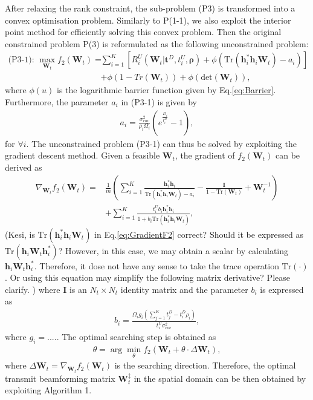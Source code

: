 \documentclass[12pt,draftcls,onecolumn,journal]{IEEEtran}
\begin{document}
After relaxing the rank constraint, the sub-problem (P3) is transformed into a convex optimisation problem. Similarly to P(1-1), we also exploit the interior point method for efficiently solving this convex problem. Then the original constrained problem P(3) is reformulated as the following unconstrained problem:
\begin{align}
	\text{(P3-1): } \max_{\mathbf{W}_t} f_2(\mathbf{W}_t) = &\sum_{i=1}^{K} \left[R_{i}^U (\mathbf{W}_t | \mathbf{t}^D, t_i^U, \boldsymbol{\rho}) + \phi(\text{Tr}(\mathbf{h}_i^*\mathbf{h}_i\mathbf{W}_t)-a_i)\right] \nonumber \\
	& + \phi(1-Tr(\mathbf{W}_t)) + \phi(\text{det}(\mathbf{W}_t)), \label{eq:P3-1}
\end{align}
where $\phi(u)$ is the logarithmic barrier function given by Eq.\eqref{eq:Barrier}. Furthermore, the parameter $a_i$ in (P3-1) is given by
\begin{align}
	a_i = \frac{\sigma_{cov}^2}{\rho_i \Omega_i}(e^{\frac{D_i}{t^D_i}} - 1),
\end{align}
for $\forall i$. The unconstrained problem (P3-1) can thus be solved by exploiting the gradient descent method. Given a feasible $\mathbf{W}_t$, the gradient of $f_2(\mathbf{W}_t)$ can be derived as
\begin{align}
	\nabla_{\mathbf{W}_t}f_2(\mathbf{W}_t) = & \frac{1}{m}\left(\sum_{i=1}^{K}\frac{\mathbf{h}_i^*\mathbf{h}_i}{\text{Tr}(\mathbf{h}_i^*\mathbf{h}_i\mathbf{W}_t) - a_i} - \frac{\mathbf{I}}{1 - \mathrm{Tr}(\mathbf{W}_t)} + \mathbf{W}_t^{-1}\right) \nonumber \\
	& + \sum_{i=1}^K\frac{t_i^Ub_i \mathbf{h}_i^*\mathbf{h}_i}{1 +  b_i\text{Tr}(\mathbf{h}_i^*\mathbf{h}_i\mathbf{W}_t)}, \label{eq:GradientF2}
\end{align}
{\color{red} (Kesi, is $\text{Tr}(\mathbf{h}_i^*\mathbf{h}_i\mathbf{W}_t)$ in Eq.\eqref{eq:GradientF2} correct? Should it be expressed as $\text{Tr}(\mathbf{h}_i\mathbf{W}_t\mathbf{h}_i^*)$? However, in this case, we may obtain a scalar by calculating $\mathbf{h}_i\mathbf{W}_t\mathbf{h}_i^*$. Therefore, it dose not have any sense to take the trace operation $\text{Tr}(\cdot)$. Or using this equation may simplify the following matrix derivative? Please clarify. )} where $\mathbf{I}$ is an $N_t\times N_t$ identity matrix and the parameter $b_i$ is expressed as
\begin{align}
	b_i = \frac{\Omega_ig_i(\sum_{j=1}^{K}t_j^D - t_i^D\rho_i)}{t_i^U\sigma_{cov}^2}, \label{eq:Bi}
\end{align}
where $g_i = ....$. The optimal searching step is obtained as
\begin{align}
	\theta = \arg \min_{\theta} f_2(\mathbf{W}_t + \theta\cdot \Delta \mathbf{W}_t), \label{eq:SearchStepF2}
\end{align}
where $\Delta \mathbf{W}_t = \nabla_{\mathbf{W}_t}f_2(\mathbf{W}_t)$ is the searching direction. Therefore, the optimal transmit beamforming matrix $\mathbf{W}_{t}^{\ddagger}$ in the spatial domain can be then obtained by exploiting Algorithm 1. \cbstart \cbend
\end{document}
